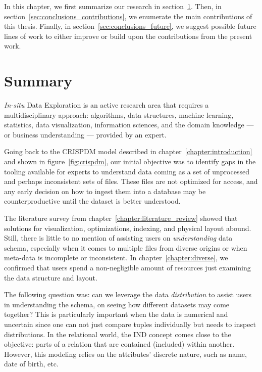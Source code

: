 In this chapter, we first summarize our research in section~\ref{sec:conclusions_summary}.
Then, in section~\ref{sec:conclusions_contributions}, we enumerate the main contributions
of this thesis. Finally, in section~\ref{sec:conclusions_future}, we suggest possible
future lines of work to either improve or build upon the contributions from the present work.

\section{Summary}
\label{sec:conclusions_summary}

\emph{In-situ} Data Exploration is an active research area that requires
a multidisciplinary approach: algorithms, data structures, machine learning,
statistics,  data visualization, information sciences, and the domain knowledge
--- or business understanding ---  provided by an expert.

Going back to the \gls{CRISPDM} model described in  chapter~\ref{chapter:introduction}
and shown in figure~\ref{fig:crispdm}, our initial objective was to identify
gaps in the tooling available for experts to understand data coming as a set of
unprocessed and perhaps inconsistent sets of files. These files are not optimized
for access, and any early decision on how to ingest them into a database may be
counterproductive until the dataset is better understood.

The literature survey from chapter~\ref{chapter:literature_review} showed that
solutions for visualization, optimizations, indexing, and physical layout abound.
Still, there is little to no mention of assisting users on \emph{understanding}
data schema, especially when it comes to multiple files from diverse origins or
when meta-data is incomplete or inconsistent.
In chapter~\ref{chapter:diverse}, we confirmed that users spend a non-negligible
amount of resources just examining the data structure and layout.

The following question was: can we leverage the data \emph{distribution} to
assist users in understanding the schema, on seeing how different datasets may come together?
This is particularly important when the data is numerical and uncertain since
one can not just compare tuples individually but needs to inspect distributions.
In the relational world, the \gls{IND} concept comes close to the objective:
parts of a relation that are contained (included) within another. However, this modeling
relies on the attributes' discrete nature, such as name, date of birth, etc.

